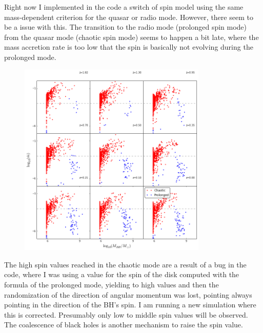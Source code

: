 \documentclass[a4,useAMS,usenatbib,usegraphicx,12pt]{article}
\begin{document}
Right now I implemented in the code a switch of spin model using the same mass-dependent criterion for the 
quasar or radio mode. However, there seem to be a issue with this. The transition to the radio mode (prolonged
spin mode) from the quasar mode (chaotic spin mode) seems to happen a bit late, where the mass accretion rate
is too low that the spin is basically not evolving during the prolonged mode.


\begin{figure}[htbp]
\centering
\includegraphics[width=0.8\textwidth]{./figures/MassAccretion.png}
\end{figure}

The high spin values reached in the chaotic mode are a result of a bug in the code, where I was using a value 
for the spin of the disk computed with the formula of the prolonged mode, yielding to high values and then
the randomization of the direction of angular momentum was lost, pointing always pointing in the direction of 
the BH's spin. I am running a new simulation where this is corrected. Presumably only low to middle spin values
will be observed. The coalescence of black holes is another mechanism to raise the spin value.

\newpage
\end{document}
